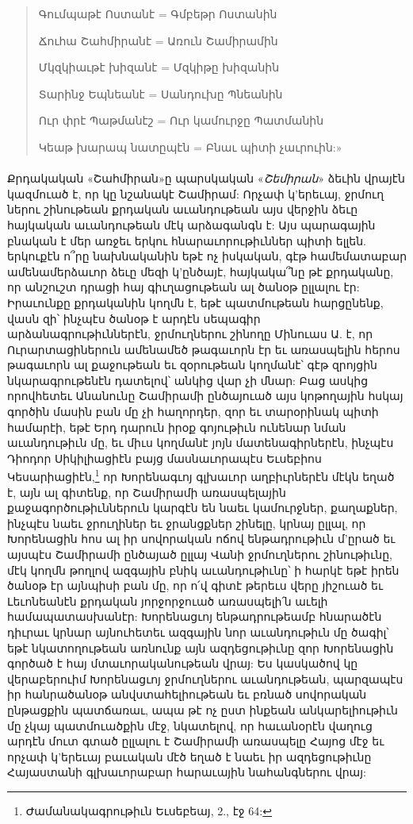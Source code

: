 \documentclass{article}
\begin{document}
{\begin{quotation}
Գումպաթէ Ոստանէ = Գմբեթր Ոստանին

Ճուհա Շահմիրանէ = Առուն Շամիրամին

Մկզկիաւթէ խիզանէ = Մզկիթը խիզանին

Տարինջ Եպնեանէ = Սանդուխը Պնեանին

Ուր փրէ Պաթմանէշ = Ուր կամուրջը Պատմանին

Կեաթ խարապ նատըպէն = Բնաւ պիտի չաւրուին:»
\end{quotation}
\paragraph{}
Քրդակական «Շահմիրան»ը պարսկական «\emph{Շեմիրան}» ձեւին վրայէն կազմուած է, որ կը նշանակէ Շամիրամ: Որչափ կ'երեւայ, ջրմուղ ներու շինութեան քրդական աւանդութեան այս վերջին ձեւը հայկական աւանդութեան մէկ արձագանգն է: Այս պարագային բնական է մեր առջեւ երկու հնարաւորութիւններ պիտի ելլեն. երկուքէն ո՞րը նախնականին եթէ ոչ իսկական, գէթ համեմատաբար ամենամերձաւոր ձեւը մեզի կ'ընծայէ, հայկակա՞նը թէ քրդականը, որ անշուշտ դրացի հայ գիւղացութեան ալ ծանօթ ըլլալու էր: Իրաւունքը քրդականին կողմն է, եթէ պատմութեան հարցընենք, վասն զի՝ ինչպէս ծանօթ է արդէն սեպագիր արձանագրութիւններէն, ջրմուղներու շինողը Մինուաս Ա. է, որ Ուրարտացիներուն ամենամեծ թագաւորն էր եւ առասպելին հերոս թագաւորն ալ քաջութեան եւ զօրութեան կողմանէ՝ գէթ զրոյցին նկարագրութենէն դատելով՝ անկից վար չի մնար: Բաց ասկից որովհետեւ Անանունը Շամիրամի ընծայուած այս կոթողային հսկայ գործին մասին բան մը չի հաղորդեր, զոր եւ տարօրինակ պիտի համարէի, եթէ Երդ դարուն իրօք գոյութիւն ունենար նման աւանդութիւն մը, եւ միւս կողմանէ յոյն մատենագիրներէն, ինչպէս Դիոդոր Սիկիլիացիէն բայց մասնաւորապէս Եւսեբիոս Կեսարիացիէն,\footnote{Ժամանակագրութիւն Եւսեբեայ, 2., էջ 64:} որ Խորենագւոյ գլխաւոր աղբիւրներէն մէկն եղած է, այն ալ գիտենք, որ Շամիրամի առասպելային քաջագործութիւններուն կարգէն են նաեւ կամուրջներ, քաղաքներ, ինչպէս նաեւ ջրուղիներ եւ ջրանցքներ շինելը, կրնայ ըլլալ, որ Խորենացին հոս ալ իր սովորական ոճով ենթադրութիւն մ'ըրած եւ այսպէս Շամիրամի ընծայած ըլլայ Վանի ջրմուղներու շինութիւնը, մէկ կողմն թողլով ազգային բնիկ աւանդութիւնը՝ ի հարկէ եթէ իրեն ծանօթ էր այնպիսի բան մը, որ ո՛վ գիտէ թերեւս վերը յիշուած եւ Լեւոնեանէն քրդական յորջորջուած առասպելի՛ն աւելի համապատասխանէր: Խորենացւոյ ենթադրութեամբ հնարածէն դիւրաւ կրնար այնուհետեւ ազգային նոր աւանդութիւն մը ծագիլ՝ եթէ նկատողութեան առնունք այն ազդեցութիւնը զոր Խորենացին գործած է հայ մտաւորականութեան վրայ: Ես կասկածով կը վերաբերուիմ Խորենացւոյ ջրմուղներու աւանդութեան, պարզապէս իր հանրածանօթ անվստահելիութեան եւ բռնած սովորական ընթացքին պատճառաւ, ապա թէ ոչ ըստ ինքեան անկարելիութիւն մը չկայ պատմուածքին մէջ, նկատելով, որ հաւանօրէն վաղուց արդէն մուտ գտած ըլլալու է Շամիրամի առասպելը Հայոց մէջ եւ որչափ կ'երեւայ բաւական մէծ եղած է նաեւ իր ազդեցութիւնը Հայաստանի գլխաւորաբար հարաւային նահանգներու վրայ:

}
\end{document}

